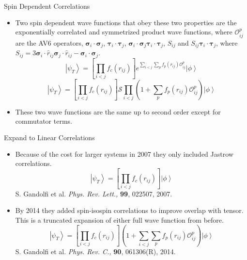 \documentclass{beamer}
\newcommand{\ket}[1]{\left| #1 \right>}
\newcommand{\fpij}{f_p(r_{ij})}
\newcommand{\Opij}{\mathcal{O}_{ij}^p}
\newcommand{\ti}{\bm{\tau}_i}
\newcommand{\tj}{\bm{\tau}_j}
\newcommand{\si}{\bm{\sigma}_i}
\newcommand{\sj}{\bm{\sigma}_j}
\begin{document}
\begin{frame}{Spin Dependent Correlations}
\begin{itemize}
   \item Two spin dependent wave functions that obey these two properties are the exponentially correlated and symmetrized product wave functions, where $\Opij$ are the AV6 operators, $\si\cdot\sj$, $\ti\cdot\tj$,     $\si\cdot\sj \ti\cdot\tj$, $S_{ij}$ and $S_{ij} \ti\cdot\tj$, where $S_{ij}     = 3\si\cdot\hat{r}_{ij}\sj\cdot\hat{r}_{ij}-\si\cdot\sj$.
   \begin{equation*}
      \ket{\psi_T} = \left[\prod\limits_{i<j}f_c(r_{ij})\right] e^{\sum\limits_{i<j}\sum\limits_p\fpij\Opij} \ket{\phi}
   \end{equation*}
   \begin{equation*}
      \ket{\psi_T} = \left[\prod\limits_{i<j}f_c(r_{ij})\right] \mathcal{S}\prod\limits_{i<j}\left(1+\sum\limits_p\fpij\Opij\right) \ket{\phi}
   \end{equation*}
   \item These two wave functions are the same up to second order except for  commutator terms.
\end{itemize}
\end{frame}

\begin{frame}{Expand to Linear Correlations}
\begin{itemize}
   \item Because of the cost for larger systems in 2007 they only included Jastrow correlations.
   \begin{equation*}
      \ket{\psi_T} = \left[\prod\limits_{i<j}f_c(r_{ij})\right]\ket{\phi}
   \end{equation*}
   {\tiny S. Gandolfi et al. \textit{Phys. Rev. Lett.,} \textbf{99}, 022507, 2007.}
   \item By 2014 they added spin-isospin correlations to improve overlap with tensor. This is a truncated expansion of either full wave function from before.
   \begin{equation*}
      \ket{\psi_T} = \left[\prod\limits_{i<j}f_c(r_{ij})\right] \left(1+\sum\limits_{i<j}\sum\limits_p\fpij\Opij\right) \ket{\phi}
   \end{equation*}
   {\tiny S. Gandolfi et al. \textit{Phys. Rev. C.,} \textbf{90}, 061306(R), 2014.}
\end{itemize}
\end{frame}
\end{document}
